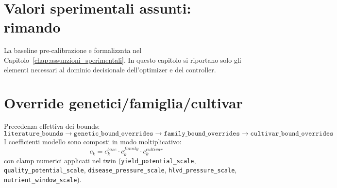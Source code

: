 ﻿\documentclass[11pt,a4paper]{report}
\begin{document}
\section{Valori sperimentali assunti: rimando}
La baseline pre-calibrazione e formalizzata nel Capitolo~\ref{chap:assunzioni_sperimentali}.
In questo capitolo si riportano solo gli elementi necessari al dominio decisionale dell'optimizer e del controller.

\section{Override genetici/famiglia/cultivar}
Precedenza effettiva dei bounds:
\[
\texttt{literature\_bounds} \rightarrow \texttt{genetic\_bound\_overrides} \rightarrow \texttt{family\_bound\_overrides} \rightarrow \texttt{cultivar\_bound\_overrides}
\]
I coefficienti modello sono composti in modo moltiplicativo:
\[
c_k = c^{base}_k \cdot c^{family}_k \cdot c^{cultivar}_k
\]
con clamp numerici applicati nel twin (\texttt{yield\_potential\_scale}, \texttt{quality\_potential\_scale}, \texttt{disease\_pressure\_scale}, \texttt{hlvd\_pressure\_scale}, \texttt{nutrient\_window\_scale}).
\end{document}
